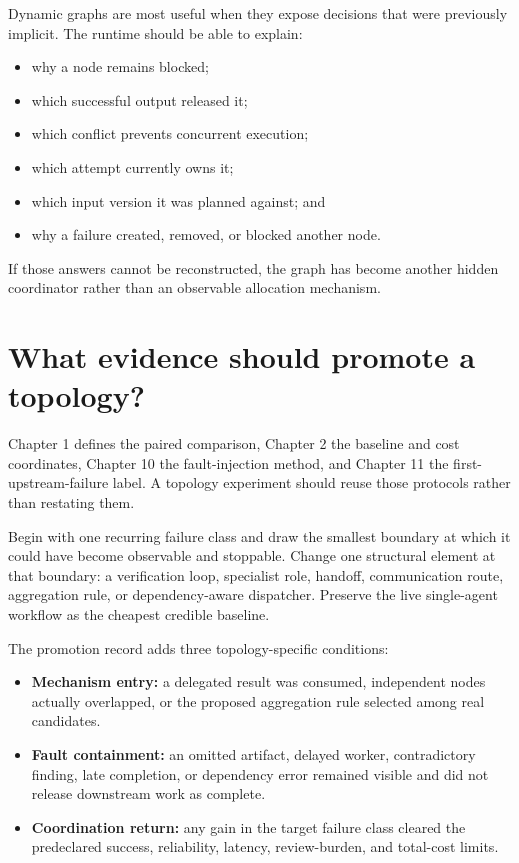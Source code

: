 
Dynamic graphs are most useful when they expose decisions that were previously implicit. The runtime should be able to explain:

\begin{itemize}
\tightlist
\item
  why a node remains blocked;
\item
  which successful output released it;
\item
  which conflict prevents concurrent execution;
\item
  which attempt currently owns it;
\item
  which input version it was planned against; and
\item
  why a failure created, removed, or blocked another node.
\end{itemize}

If those answers cannot be reconstructed, the graph has become another hidden coordinator rather than an observable allocation mechanism.

\hypertarget{what-evidence-should-promote-a-topology}{%
\section{What evidence should promote a topology?}\label{what-evidence-should-promote-a-topology}}

Chapter 1 defines the paired comparison, Chapter 2 the baseline and cost coordinates, Chapter 10 the fault-injection method, and Chapter 11 the first-upstream-failure label. A topology experiment should reuse those protocols rather than restating them.

Begin with one recurring failure class and draw the smallest boundary at which it could have become observable and stoppable. Change one structural element at that boundary: a verification loop, specialist role, handoff, communication route, aggregation rule, or dependency-aware dispatcher. Preserve the live single-agent workflow as the cheapest credible baseline.


The promotion record adds three topology-specific conditions:

\begin{itemize}
\tightlist
\item
  \textbf{Mechanism entry:} a delegated result was consumed, independent nodes actually overlapped, or the proposed aggregation rule selected among real candidates.
\item
  \textbf{Fault containment:} an omitted artifact, delayed worker, contradictory finding, late completion, or dependency error remained visible and did not release downstream work as complete.
\item
  \textbf{Coordination return:} any gain in the target failure class cleared the predeclared success, reliability, latency, review-burden, and total-cost limits.
\end{itemize}

